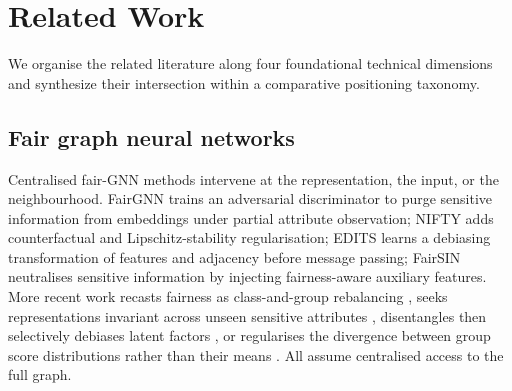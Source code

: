 \documentclass[preprint,12pt]{elsarticle}
\theoremstyle{plain}
\theoremstyle{definition}
\theoremstyle{remark}
\begin{document}
\section{Related Work}
\label{sec:related}

We organise the related literature along four foundational technical dimensions and synthesize their intersection within a comparative positioning taxonomy.

\subsection{Fair graph neural networks}
Centralised fair-GNN methods intervene at the representation, the input, or the neighbourhood. FairGNN \cite{dai2021say} trains an adversarial discriminator to purge sensitive information from embeddings under partial attribute observation; NIFTY \cite{agarwal2021nifty} adds counterfactual and Lipschitz-stability regularisation; EDITS \cite{dong2022edits} learns a debiasing transformation of features and adjacency before message passing; FairSIN \cite{yang2024fairsin} neutralises sensitive information by injecting fairness-aware auxiliary features. More recent work recasts fairness as class-and-group rebalancing \cite{li2024fairgb}, seeks representations invariant across unseen sensitive attributes \cite{zhu2024fairinv}, disentangles then selectively debiases latent factors \cite{lee2025dabgnn}, or regularises the divergence between group score distributions rather than their means \cite{fnrgnn2025}. All assume centralised access to the full graph.
\end{document}
